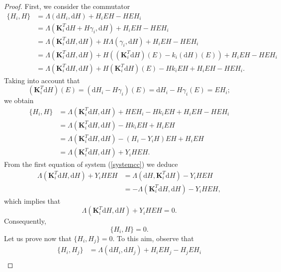 \documentclass[10pt]{amsart}
\numberwithin{equation}{section}
\newcommand{\rd}{\mathrm{d}}
\newcommand{\bs}{\boldsymbol}
\theoremstyle{definition}
\begin{document}
\begin{proof}
First, we consider the commutator 
\begin{equation}
\begin{split}
\lbrace H_{i},H\rbrace &=\Lambda(\rd H_{i},\rd H)+H_{i}EH-HEH_{i}\\
&=\Lambda(\bs{K}_{i}^{T}\rd H+H\gamma_{i},\rd H)+H_{i}EH-HEH_{i}\\
&=\Lambda(\bs{K}_{i}^{T}\rd H,\rd H)+H\Lambda(\gamma_{i},\rd H)+H_{i}EH-HEH_{i}\\
&=\Lambda(\bs{K}_{i}^{T}\rd H,\rd H)+H((\bs{K}_{i}^{T}\rd H)(E)-k_{i}(\rd H)(E))+H_{i}EH-HEH_{i}\\
&=\Lambda(\bs{K}_{i}^{T}\rd H,\rd H)+H(\bs{K}_{i}^{T}\rd H)(E)-Hk_{i}EH+H_{i}EH-HEH_{i}.
\end{split}
\end{equation}
Taking into account that
\begin{equation}
(\bs{K}_{i}^{T}\rd H)(E)=(\rd H_{i}-H\gamma_{i})(E)=\rd H_{i}-H\gamma_{i}(E)=EH_{i};
\end{equation}
we obtain
\begin{equation}
\begin{split}
\lbrace H_{i},H\rbrace &=\Lambda(\bs{K}_{i}^{T}\rd H,\rd H)+HEH_{i}-Hk_{i}EH+H_{i}EH-HEH_{i}\\
&=\Lambda(\bs{K}_{i}^{T}\rd H,\rd H)-Hk_{i}EH+H_{i}EH\\
&=\Lambda(\bs{K}_{i}^{T}\rd H,\rd H)-(H_{i}-Y_{i}H)EH+H_{i}EH\\
&=\Lambda(\bs{K}_{i}^{T}\rd H,\rd H)+Y_{i}HEH.
\end{split}
\end{equation}
From the first equation of system (\ref{systemcc}) we deduce
\begin{equation}
\begin{split}
\Lambda(\bs{K}_{i}^{T}\rd H,\rd H)+Y_{i}HEH&=\Lambda(\rd H,\bs{K}_{i}^{T}\rd H)-Y_{i}HEH\\
&=-\Lambda(\bs{K}_{i}^{T}\rd H,\rd H)-Y_{i}HEH,
\end{split}
\end{equation}
which implies that $$\Lambda(\bs{K}_{i}^{T}\rd H,\rd H)+Y_{i}HEH=0.$$  Consequently,
\begin{equation}
\lbrace H_{i},H\rbrace=0.
\end{equation}
Let us prove now that $\lbrace H_{i},H_{j}\rbrace=0$. To this aim, observe that
\begin{equation}
\begin{split}
\lbrace H_{i},H_{j}\rbrace &=\Lambda(\rd H_{i},\rd H_{j})+H_{i}EH_{j}-H_{j}EH_{i}\\

\end{split}
\end{equation}
\end{proof}
\end{document}
